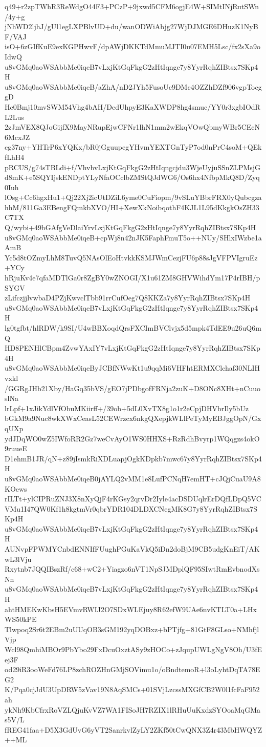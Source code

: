 q49+r2zpTWhR3ReWdgO44F3+PCzP+9jxwd5CFM6ogjE4W+SIMtINjRutSWn/4y+g
jNhWD2ljhJ/gUl1egLXPBlvUD+du/wanODWiAbjg27WjDJMGE6DHuzK1NyBF/VAJ
isO+6zGIfKuE9exKGPHwvF/dpAWjDKKTdMmuMJTI0u07EMH5Lsc/fx2sXa9oIdwQ
u8vGMq0aoWSAbbMe0iqeB7vLxjKtGqFkgG2zHtIqnge7y8YyrRqhZIBtsx7SKp4H
u8vGMq0aoWSAbbMe0iqeB/aZhA/nD2JYh5FusoUc9DMc4OZZhDZf906vgpTocggD
Hc0Bmj10mvSWM54Vhg4bAH/DedUhpyE3KaXWDP8hg4smuc/YY0r3xgbIOdRL2Lus
2zJmVEX8QJoGijfX9MayNRupEjwCFNr1lhN1mm2wEkqVOwQbmyWBr5CEcN6McxJZ
cg37ny+YHTrP6xYQKx/bR0jGguupegYHvmYEXTGnTyP7od0nPrC4soM+QEkfLhH4
pRCUS/g74sTBLdi+f/VhvbvLxjKtGqFkgG2zHtIqngcjdu3WjeUyjuSSnZLPMsjG
d8mK+e5SQYIjskENDptYLyNfaOCclbZMStQJdWG6/Os6hx4NfbpMkQ8D/Zyq0Iuh
lOsg+Cc6hgxHu1+Qj22Xj2icUtDZiL6yme0CuFiopm/9vSLuYBbrFRX0yQubcgza
hhM/811Ga3EBengFQmkbXVO/HI+XewXkNoibqothF4KJL1L95dKkgkOsZH33C7TX
Q/wybi+49bGAfgVeDlaiYrvLxjKtGqFkgG2zHtIqnge7y8YyrRqhZIBtsx7SKp4H
u8vGMq0aoWSAbbMe0iqeB+cpWj8n42nJK5FaphFmuT5o++NUy/SHlxIWzbe1aAmB
Yc5d8tOZmyLhM8TuvQ5NAsOlEoHtvkkKSMJWmCezjFU6p88sJgVFPVIgruEz+YCy
hRjuKv4e7qfaMDTlGa0r8ZgBY0wZNOGI/X1u61ZM8GHVWihdYm17P4rIBH/pSYGV
zLifczjjlvwbaD4PZjKwvclTbb91rrCufOeg7Q8KKZa7y8YyrRqhZIBtsx7SKp4H
u8vGMq0aoWSAbbMe0iqeB7vLxjKtGqFkgG2zHtIqnge7y8YyrRqhZIBtsx7SKp4H
lg0tgfbt/hlRDW/k9SI/U4wBBXoqdQrsFXCImBVClvjx5d5mpk4TdEE9u26uQ6mQ
HD8PENHlCBpm4ZvwYAxIY7vLxjKtGqFkgG2zHtIqnge7y8YyrRqhZIBtsx7SKp4H
u8vGMq0aoWSAbbMe0iqeByJCBfNWwKt1u9qqMi6VHFhtERMXClchaf30NLIHvxkl
/GGRgJHb21Xby/HaGq35bVS/gEO7jPDbgofFRNja2zuK+D8ONc8XHt+nCuuoslNa
lrLpf+1xJikYdlVfObuMKiirff+/39ob+5dL0XvTX8g1o1r2eCpjDHVbrIly5bUz
bGkM9a9Nuc8wkXWxCeasL52CEWrzcx6nkgQXepjkWLlPeTyMyEBJggOpN/GxqUXp
ydJDqWO0wZ5IWfoRR2Gz7weCvAyO1WS0HHXS+RzRdhBvyrp1WQqgzs4okO9ruueE
D1ehmB1JR/qN+z89jIsmkRiXDLuapjOgkKDpkb7mwc67y8YyrRqhZIBtsx7SKp4H
u8vGMq0aoWSAbbMe0iqeB0jAYLQ2vMM1e8LufPCNqH7emHT+cJQjCuaU9A8KOews
rILTt+ylCIPRuZNJ3X8nXyQjF4rKGsy2qrvDr2Iyle4acDSDUqlrErDQfLDpQ5VC
VMu1I47QW0Kf1h8kgtmVr0qbrYDR104DLDXCNegMK8G7y8YyrRqhZIBtsx7SKp4H
u8vGMq0aoWSAbbMe0iqeB7vLxjKtGqFkgG2zHtIqnge7y8YyrRqhZIBtsx7SKp4H
AUNvpFPWMYCnbdENNIfFUughPGuKaVkQ5iDn2doBjM9CB5udgKnEiT/AKwL3lVju
Rxytnb7JQQIBszRf/c68+wC2+Yiagzo6nVT1NpSJMDplQF95SIwtRmEvbnodXsNn
u8vGMq0aoWSAbbMe0iqeB7vLxjKtGqFkgG2zHtIqnge7y8YyrRqhZIBtsx7SKp4H
ahtHMEKwKbsH5EVmvRWIJ2O7SDxWLEjuy8R62efW9UAe6nvKTLT0a+LHxWS50kPE
Tlwpoq2Sr6t2EBm2uUUqOB3sGM192yqDOBxz+bPTjfg+81GtF8GLso+NMhfjlVjp
Wcl98QmhiMBOr9PbYbo29FxDcuOxztASy9zHOCo+zJqupUWLgNgV8Oh/U3fEej3F
od29iR3ooWeFd76LP8zchROZHnGMjSOVimu1o/oBndtemoR+l3oLyhtDqTA78EG2
K/Pqa0cjJdU3UpDRW5zVav19N8AqSMCs+01SVjLzcssMXGfCB2W0l1fcFaF952ah
ykNh9KbCfrxRoVZLQjuKvVZ7WA1FISoJH7RZIX1lRHuUuKxdzSYOoaMqGMas5V/L
fREG41faa+D5X3GdUvG6yVT2SanrkvlZyLY2ZKf50tCwQNX3Z4r43MbHWQYZ++ML
